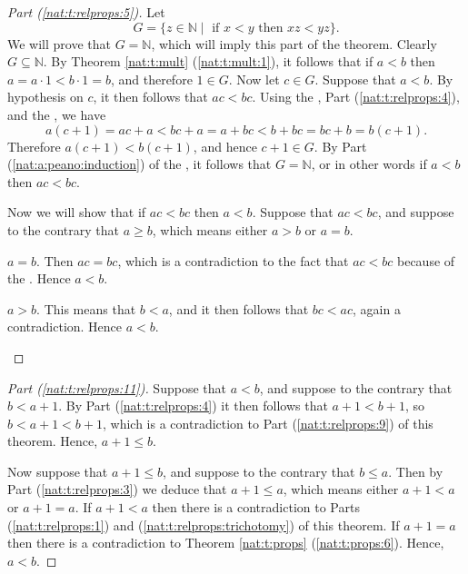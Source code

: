 \begin{proof}[Part (\ref{nat:t:relprops:5})]
	Let
	\[
		G = \{ z \in \mathbb{N} \mid \text{ if } x < y \text{ then } x z < y z \}.
	\]
	We will prove that $G = \mathbb{N}$, which will imply this part of the theorem. Clearly $G \subseteq \mathbb{N}$. By Theorem \ref{nat:t:mult} (\ref{nat:t:mult:1}), it follows that if $a < b$ then $a = a \cdot 1 < b \cdot 1 = b$, and therefore $1 \in G$.  Now let $c \in G$. Suppose that $a < b$. By hypothesis on $c$, it then follows that $a c < b c$. Using the , Part (\ref{nat:t:relprops:4}), and the , we have
	\[
		a(c + 1) = a c + a < b c + a = a + b c < b + b c = b c + b = b(c + 1).
	\]
	Therefore $a(c + 1) < b(c + 1)$, and hence $c + 1 \in G$. By Part (\ref{nat:a:peano:induction}) of the , it follows that $G = \mathbb{N}$, or in other words if $a < b$ then $a c < b c$.

	Now we will show that if $a c < b c$ then $a < b$. Suppose that $a c < b c$, and suppose to the contrary that $a \geq b$, which means either $a > b$ or $a = b$.
	\begin{bycases}
		\item $a = b$. Then $a c = b c$, which is a contradiction to the fact that $a c < b c$ because of the . Hence $a < b$.
		\item $a > b$. This means that $b < a$, and it then follows that $b c < a c$, again a contradiction. Hence $a < b$.
	\end{bycases}
\end{proof}

\begin{proof}[Part (\ref{nat:t:relprops:11})]
	Suppose that $a < b$, and suppose to the contrary that $b < a + 1$. By Part (\ref{nat:t:relprops:4}) it then follows that $a + 1 < b + 1$, so $b < a + 1 < b + 1$, which is a contradiction to Part (\ref{nat:t:relprops:9}) of this theorem. Hence, $a + 1 \leq b$.

	Now suppose that $a + 1 \leq b$, and suppose to the contrary that $b \leq a$. Then by Part (\ref{nat:t:relprops:3}) we deduce that $a + 1 \leq a$, which means either $a + 1 < a$ or $a + 1 = a$. If $a + 1 < a$ then there is a contradiction to Parts (\ref{nat:t:relprops:1}) and (\ref{nat:t:relprops:trichotomy}) of this theorem. If $a + 1 = a$ then there is a contradiction to Theorem \ref{nat:t:props} (\ref{nat:t:props:6}). Hence, $a < b$.
\end{proof}

